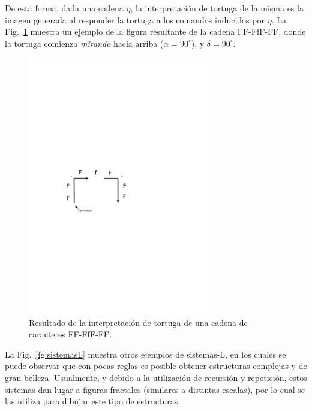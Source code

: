 De esta forma, dada una cadena $\eta$, la interpretación de tortuga de la misma es la imagen generada al responder la tortuga a los comandos inducidos por $\eta$.
La Fig.~\ref{fg:tortuga} muestra un ejemplo de la figura resultante de la cadena FF-FfF-FF, donde la tortuga comienza {\em mirando} hacia arriba ($\alpha = 90^{\circ}$), y $\delta = 90^{\circ}$.

\begin{figure}
\center
\includegraphics[width=8cm]{figures/tortuga}
\caption[Resultado de la interpretación de tortuga de una cadena de caracteres]{Resultado de la interpretación de tortuga de una cadena de caracteres FF-FfF-FF.}
\label{fg:tortuga}
\end{figure}

La Fig.~\ref{fg:sistemasL} muestra otros ejemplos de sistemas-L, en los cuales se puede observar que con pocas reglas es posible obtener estructuras complejas y de gran belleza.
Usualmente, y debido a la utilización de recursión y repetición, estos sistemas dan lugar a figuras fractales (similares a distintas escalas), por lo cual se las utiliza para dibujar este tipo de estructuras.

